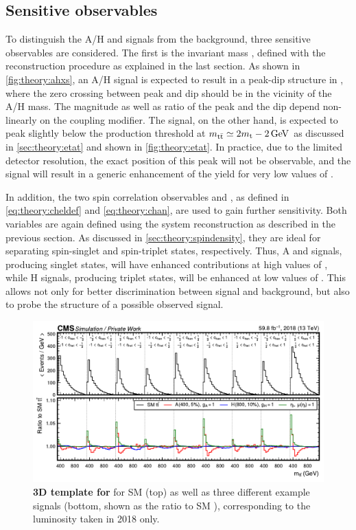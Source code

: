 \subsection{Sensitive observables}

To distinguish the A/H and \etat signals from the background, three sensitive observables are considered. The first is the invariant \ttbar mass \mtt, defined with the reconstruction procedure as explained in the last section. As shown in \cref{fig:theory:ahxs}, an A/H signal is expected to result in a peak-dip structure in \mtt, where the zero crossing between peak and dip should be in the vicinity of the A/H mass. The magnitude as well as ratio of the peak and the dip depend non-linearly on the coupling modifier. The \etat signal, on the other hand, is expected to peak slightly below the \ttbar production threshold at $m_{\mathrm{t \bar{t}}} \simeq 2 m_{\mathrm{t}} - \SI{2}{GeV}$ as discussed in \cref{sec:theory:etat} and shown in \cref{fig:theory:etat}. In practice, due to the limited detector resolution, the exact position of this peak will not be observable, and the signal will result in a generic enhancement of the yield for very low values of \mtt.

In addition, the two spin correlation observables \chel and \chan, as defined in \cref{eq:theory:cheldef} and \cref{eq:theory:chan}, are used to gain further sensitivity. Both variables are again defined using the \ttbar system reconstruction as described in the previous section. As discussed in \cref{sec:theory:spindensity}, they are ideal for separating spin-singlet and spin-triplet states, respectively. Thus, A and \etat signals, producing singlet states, will have enhanced contributions at high values of \chel, while H signals, producing  triplet states, will be enhanced at low values of \chan. This allows not only for better discrimination between signal and background, but also to probe the \CP structure of a possible observed signal. 

\begin{figure}[t]
    \centering
    \includegraphics[width=0.99\linewidth]{figures/ah/mttchelchan.pdf}
    \caption{\textbf{3D template for \mttchelchan} for SM \ttbar (top) as well as three different example signals (bottom, shown as the ratio to SM \ttbar), corresponding to the luminosity taken in 2018 only.}
    \label{fig:ah:mttchelchan}
\end{figure}


